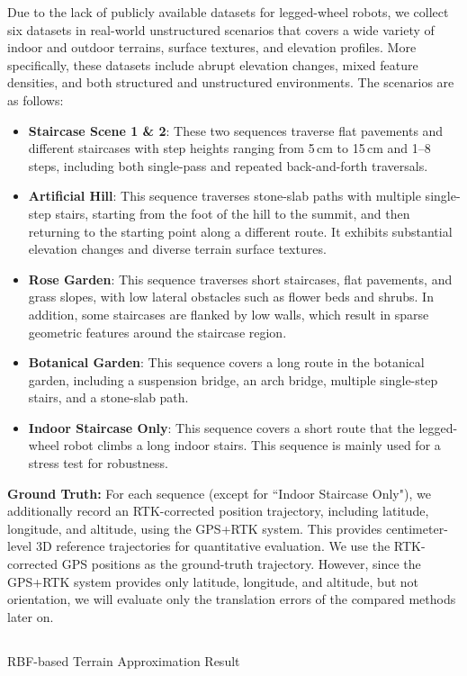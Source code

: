 \documentclass[journal,twoside,web]{ieeecolor}
\makeatletter
\let\origsubsection\subsection
\def\subsection{\@ifstar\subsectionstarcolor\subsectioncolorcmd}
\def\subsectioncolorcmd#1{\origsubsection{\textcolor{subsectioncolor}{#1}}}
\def\subsectionstarcolor#1{\origsubsection*{#1}}
\makeatother
\begin{document}
Due to the lack of publicly available datasets for legged-wheel robots, we collect six datasets in real-world unstructured scenarios that covers a wide variety of indoor and outdoor terrains, surface textures, and elevation profiles.
More specifically, these datasets include abrupt elevation changes, mixed feature densities, and both structured and unstructured environments. 
The scenarios are as follows:
\begin{itemize}
  \item \textbf{Staircase Scene 1 \& 2}: These two sequences traverse flat pavements and different staircases with step heights ranging from 5\,cm to 15\,cm and 1--8 steps, including both single-pass and repeated back-and-forth traversals.
  \item \textbf{Artificial Hill}: This sequence traverses stone-slab paths with multiple single-step stairs, starting from the foot of the hill to the summit, and then returning to the starting point along a different route. It exhibits substantial elevation changes and diverse terrain surface textures.
  \item \textbf{Rose Garden}: This sequence traverses short staircases, flat pavements, and grass slopes, with low lateral obstacles such as flower beds and shrubs. In addition, some staircases are flanked by low walls, which result in sparse geometric features around the staircase region.
  \item \textbf{Botanical Garden}: This sequence covers a long route in the botanical garden, including a suspension bridge, an arch bridge, multiple single-step stairs, and a stone-slab path.
  \item \textbf{Indoor Staircase Only}: This sequence covers a short route that the legged-wheel robot climbs a long indoor stairs. This sequence is mainly used for a stress test for robustness.
\end{itemize}

\textbf{Ground Truth:}
For each sequence (except for ``Indoor Staircase Only"), we additionally record an RTK-corrected position trajectory, including latitude, longitude, and altitude, using the GPS+RTK system. This provides centimeter-level 3D reference trajectories for quantitative evaluation.
We use the RTK-corrected GPS positions as the ground-truth trajectory. However, since the GPS+RTK system provides only latitude, longitude, and altitude, but not orientation, we will evaluate only the translation errors of the compared methods later on.

\subsection{RBF-based Terrain Approximation Result}
\end{document}
